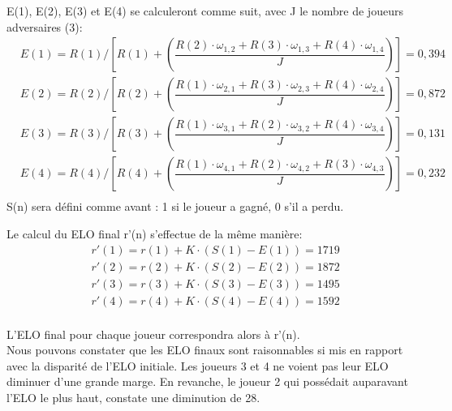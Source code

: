         E(1), E(2), E(3) et E(4) se calculeront comme suit, avec J le nombre de joueurs adversaires (3):
        \begin{equation}
            \begin{split}
                & E(1) = R(1) / [R(1) + (\dfrac{R(2) \cdot \omega_{1, 2} + R(3) \cdot \omega_{1, 3} + R(4) \cdot \omega_{1, 4}}{J})] = 0,394 \\
                & E(2) = R(2) / [R(2) + (\dfrac{R(1) \cdot \omega_{2, 1} + R(3) \cdot \omega_{2, 3} + R(4) \cdot \omega_{2,4} }{J})] = 0,872 \\
                & E(3) = R(3) / [R(3) + (\dfrac{R(1) \cdot \omega_{3, 1} + R(2) \cdot \omega_{3, 2} + R(4) \cdot \omega_{3,4} }{J})] = 0,131 \\
                & E(4) = R(4) / [R(4) + (\dfrac{R(1) \cdot \omega_{4, 1} + R(2) \cdot \omega_{4, 2} + R(3) \cdot \omega_{4,3} }{J})] = 0,232 \\
            \end{split}
        \end{equation}
        S(n) sera défini comme avant : 1 si le joueur a gagné, 0 s'il a perdu.

        Le calcul du ELO final r'(n) s'effectue de la même manière:
        \begin{equation}
            \begin{split}
                & r'(1) = r(1) + K \cdot (S(1) - E(1)) = 1719 \\
                & r'(2) = r(2) + K \cdot (S(2) - E(2)) = 1872 \\
                & r'(3) = r(3) + K \cdot (S(3) - E(3)) = 1495 \\
                & r'(4) = r(4) + K \cdot (S(4) - E(4)) = 1592 \\
            \end{split}
        \end{equation}

        L'ELO final pour chaque joueur correspondra alors à r'(n). \\
        Nous pouvons constater que les ELO finaux sont raisonnables si mis en rapport avec la disparité de l'ELO initiale. Les joueurs 3 et
        4 ne voient pas leur ELO diminuer d'une grande marge. En revanche, le joueur 2 qui possédait auparavant l'ELO le plus haut, constate une diminution de 28.
